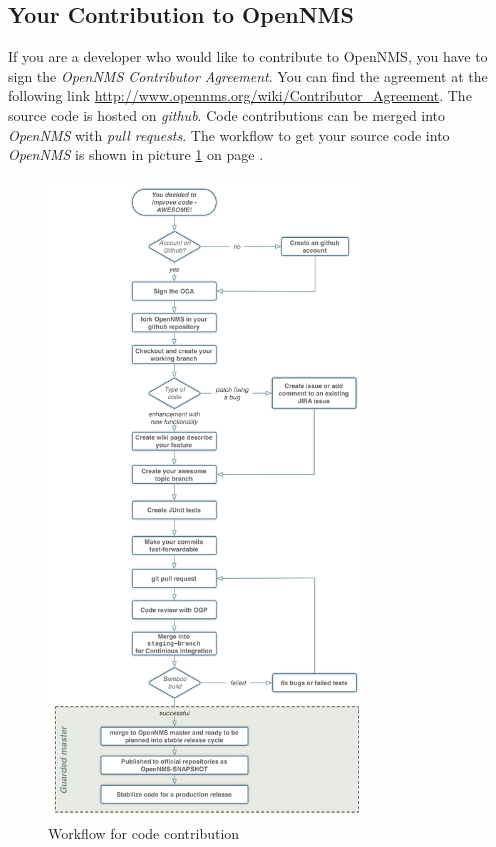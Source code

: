 \subsection*{Your Contribution to OpenNMS}
If you are a developer who would like to contribute to OpenNMS, you have to sign the \emph{OpenNMS Contributor Agreement}. You can find the agreement at the following link \url{http://www.opennms.org/wiki/Contributor_Agreement}. The source code is hosted on \emph{github}. Code contributions can be merged into \emph{OpenNMS} with \emph{pull requests}. The workflow to get your source code into \emph{OpenNMS} is shown in picture \ref{fig:contrib-workflow} on page \pageref{fig:contrib-workflow}.
\begin{figure}
	\centering
	\includegraphics[width=0.75\textwidth]{images/contribution-workflow.png}
	\caption{Workflow for code contribution}
	\label{fig:contrib-workflow}
\end{figure}

